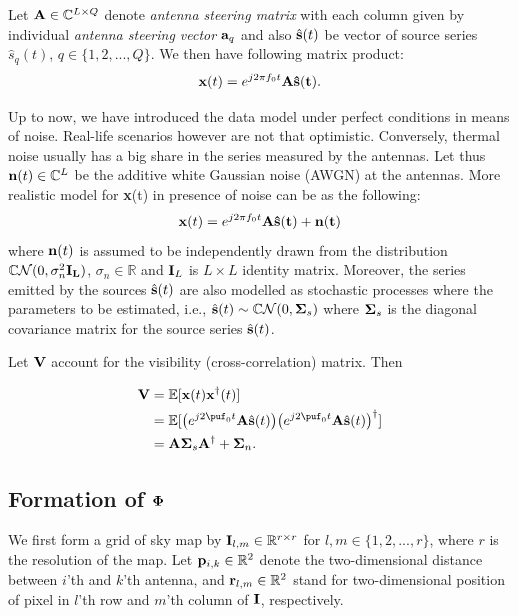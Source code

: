 \documentclass[aoas,preprint]{imsart}
\numberwithin{equation}{section}
\theoremstyle{plain}
\begin{document}
{Let ${\bf A} \in \mathbb{C}^{L\times Q}$ denote {\it antenna steering matrix} with each column given by individual {\it antenna steering vector} ${\bf a}_q$ and also $\hat{\bf{s}}(t)$ be vector of source series $\hat{s}_q(t)$, $q \in \{ 1,2,...,Q \}$. We then have following matrix product:
 \begin{equation}
 {\bf x}(t) = e^{j2\pi f_0 t}\bf{A} \hat{\bf{s}}(t).
 \end{equation}
 
 Up to now, we have introduced the data model under perfect conditions in means of noise. Real-life scenarios however are not that optimistic. Conversely, thermal noise usually has a big share in the series measured by the antennas. Let thus ${\bf n}(t) \in \mathbb{C}^L$ be the additive white Gaussian noise (AWGN) at the antennas. More realistic model for {\bf x}(t) in presence of noise can be as the following:
 \begin{equation}
 {\bf x}(t) = e^{j2\pi f_0 t}\bf{A} \hat{\bf{s}}(t) + {\bf n}(t)\label{x_t}
 \end{equation}
where ${\bf n}(t)$ is assumed to be independently drawn from the distribution $\mathbb{C} \mathcal{N}(0,\sigma_n^2 \bf{I}_L)$, $\sigma_n \in \mathbb{R}$ and ${\bf I}_L$ is $L\times L$ identity matrix. Moreover, the series emitted by the sources $\hat{{\bf s}}(t)$ are also modelled as stochastic processes where the parameters to be estimated, i.e., $\hat{{\bf s}}(t) \sim \mathbb{C}\mathcal{N}(0, {\bf \Sigma}_s)$ where ${\bf \Sigma}_s$ is the diagonal covariance matrix for the source series $\hat{{\bf s}}(t)$. 

Let ${\bf V}$ account for the visibility (cross-correlation) matrix. Then

\begin{equation}
\begin{split}
{\bf V} & = \mathbb{E}[{\bf x}(t){\bf x}^{\dagger}(t)]\\
& = \mathbb{E}[\big(e^{j2\puf_0t}{\bf A}\hat{\bf s}(t)\big)\big(e^{j2\puf_0t}{\bf A}\hat{\bf s}(t)\big)^{\dagger}]\\
& ={\bf A}{\bf \Sigma}_s{\bf A}^{\dagger} + {\bf \Sigma}_n.
    \end{split}
\end{equation}

\subsection{Formation of ${\bf \Phi}$}
We first form a grid of sky map by ${\bf I}_{l, m} \in \mathbb{R}^{r\times r}$ for $l, m \in \{1, 2, ..., r \}$, where $r$ is the resolution of the map. Let ${\bf p}_{i, k} \in \mathbb{R}^2$ denote the two-dimensional distance between $i$'th and $k$'th antenna, and ${\bf r}_{l, m}\in \mathbb{R}^2$ stand for two-dimensional position of pixel in $l$'th row and $m$'th column of ${\bf I}$, respectively. 

}
\end{document}
